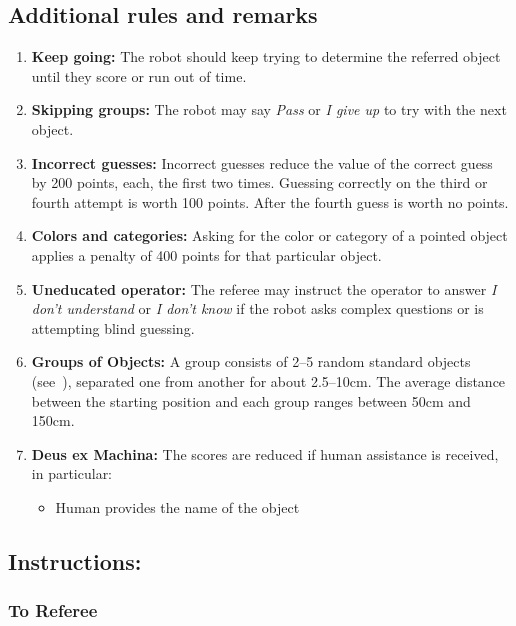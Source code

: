 \subsection*{Additional rules and remarks}
\begin{enumerate}[nosep]
	\item \textbf{Keep going:} The robot should keep trying to determine the referred object until they score or run out of time.

	\item \textbf{Skipping groups:} The robot may say \emph{Pass} or \emph{I give up} to try with the next object.

	\item \textbf{Incorrect guesses:} Incorrect guesses reduce the value of the correct guess by 200 points, each, the first two times. Guessing correctly on the third or fourth attempt is worth 100 points. After the fourth guess is worth no points.

	\item\textbf{Colors and categories:} Asking for the color or category of a pointed object applies a penalty of 400 points for that particular object.

	\item\textbf{Uneducated operator:} The referee may instruct the operator to answer \emph{I don't understand} or \emph{I don't know} if the robot asks complex questions or is attempting blind guessing.

	\item \textbf{Groups of Objects:} A group consists of 2--5 random standard objects (see~), separated one from another for about 2.5--10cm.
	The average distance between the starting position and each group ranges between 50cm and 150cm.
	\item \textbf{Deus ex Machina:} The scores are reduced if human assistance is received, in particular:
	\begin{itemize}[nosep]
		\item Human provides the name of the object
	\end{itemize}
\end{enumerate}

\subsection*{Instructions:}

\subsubsection*{To Referee}

